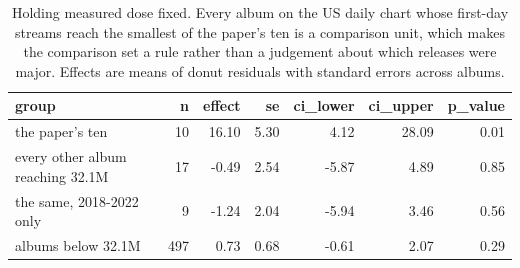 \begin{table}
\caption{Holding measured dose fixed. Every album on the US daily chart whose first-day streams reach the smallest of the paper's ten is a comparison unit, which makes the comparison set a rule rather than a judgement about which releases were major. Effects are means of donut residuals with standard errors across albums.}
\begin{tabular}{lrrrrrr}
\toprule
group & n & effect & se & ci\_lower & ci\_upper & p\_value \\
\midrule
the paper's ten & 10 & 16.10 & 5.30 & 4.12 & 28.09 & 0.01 \\
every other album reaching 32.1M & 17 & -0.49 & 2.54 & -5.87 & 4.89 & 0.85 \\
the same, 2018-2022 only & 9 & -1.24 & 2.04 & -5.94 & 3.46 & 0.56 \\
albums below 32.1M & 497 & 0.73 & 0.68 & -0.61 & 2.07 & 0.29 \\
\bottomrule
\end{tabular}
\end{table}
